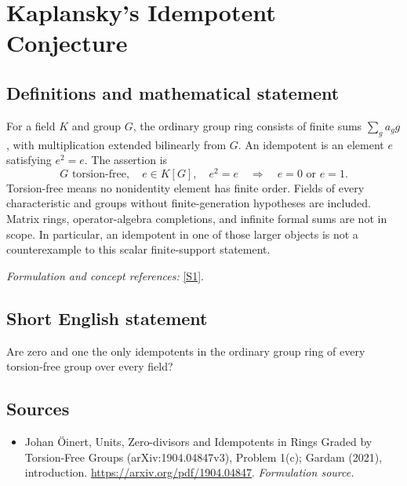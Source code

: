 \documentclass[11pt]{article}
\begin{document}
\section*{\texorpdfstring{Kaplansky's Idempotent Conjecture}{Kaplansky's Idempotent Conjecture}}\label{30006836}
\subsection{Definitions and mathematical statement}
For a field $K$ and group $G$, the ordinary group ring consists of finite sums $\sum_g a_gg$, with multiplication extended bilinearly from $G$. An idempotent is an element $e$ satisfying $e^2=e$. The assertion is
\[
 G\text{ torsion-free},\quad e\in K[G],\quad e^2=e
 \quad\Longrightarrow\quad e=0\text{ or }e=1.
\]
Torsion-free means no nonidentity element has finite order. Fields of every characteristic and groups without finite-generation hypotheses are included. Matrix rings, operator-algebra completions, and infinite formal sums are not in scope. In particular, an idempotent in one of those larger objects is not a counterexample to this scalar finite-support statement.
\par\smallskip\textit{Formulation and concept references:} \href{https://arxiv.org/pdf/1904.04847}{[S1]}.

\subsection{Short English statement}
Are zero and one the only idempotents in the ordinary group ring of every torsion-free group over every field?
\subsection{Sources}
\begin{itemize}
\item[S1]Johan Öinert, Units, Zero-divisors and Idempotents in Rings Graded by Torsion-Free Groups (arXiv:1904.04847v3), Problem 1(c); Gardam (2021), introduction.
\url{https://arxiv.org/pdf/1904.04847}.
\textit{Formulation source.}
\end{itemize}
\end{document}
